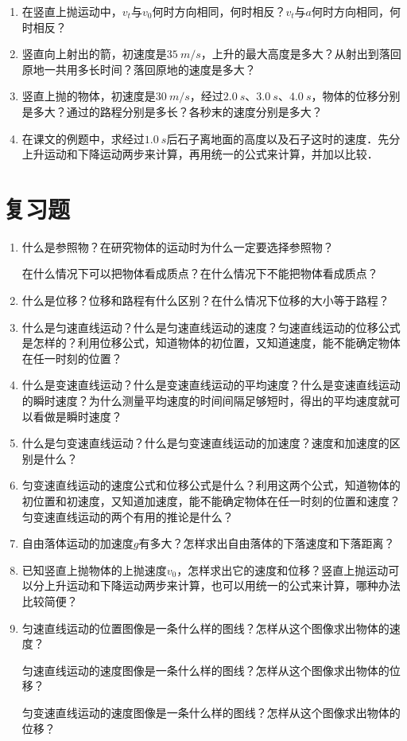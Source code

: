 \begin{enumerate}
    \item 在竖直上抛运动中，$v_t$与$v_0$何时方向相同，何时相反？$v_t$与$a$何时方向相同，何时相反？
    \item 竖直向上射出的箭，初速度是$\qty{35}{m/s}$，上升的最大高度是多大？从射出到落回原地一共用多长时间？落回原地的速度是多大？
    \item 竖直上抛的物体，初速度是$\qty{30}{m/s}$，经过$\qty{2.0}{s}$、$\qty{3.0}{s}$、$\qty{4.0}{s}$，物体的位移分别是多大？通过的路程分别是多长？各秒末的速度分别是多大？
    \item 在课文的例题中，求经过$\qty{1.0}{s}$后石子离地面的高度以及石子这时的速度．先分上升运动和下降运动两步来计算，再用统一的公式来计算，并加以比较．
\end{enumerate}

\newpage

\section*{复习题}

\begin{enumerate}
    \item 什么是参照物？在研究物体的运动时为什么一定要选择参照物？

          在什么情况下可以把物体看成质点？在什么情况下不能把物体看成质点？
    \item 什么是位移？位移和路程有什么区别？在什么情况下位移的大小等于路程？
    \item 什么是匀速直线运动？什么是匀速直线运动的速度？匀速直线运动的位移公式是怎样的？利用位移公式，知道物体的初位置，又知道速度，能不能确定物体在任一时刻的位置？
    \item 什么是变速直线运动？什么是变速直线运动的平均速度？什么是变速直线运动的瞬时速度？为什么测量平均速度的时间间隔足够短时，得出的平均速度就可以看做是瞬时速度？
    \item 什么是匀变速直线运动？什么是匀变速直线运动的加速度？速度和加速度的区别是什么？
    \item 匀变速直线运动的速度公式和位移公式是什么？利用这两个公式，知道物体的初位置和初速度，又知道加速度，能不能确定物体在任一时刻的位置和速度？
          匀变速直线运动的两个有用的推论是什么？
    \item 自由落体运动的加速度$g$有多大？怎样求出自由落体的下落速度和下落距离？
    \item 已知竖直上抛物体的上抛速度$v_0$，怎样求出它的速度和位移？竖直上抛运动可以分上升运动和下降运动两步来计算，也可以用统一的公式来计算，哪种办法比较简便？
    \item 匀速直线运动的位置图像是一条什么样的图线？怎样从这个图像求出物体的速度？

          匀速直线运动的速度图像是一条什么样的图线？怎样从这个图像求出物体的位移？

          匀变速直线运动的速度图像是一条什么样的图线？怎样从这个图像求出物体的位移？
\end{enumerate}

